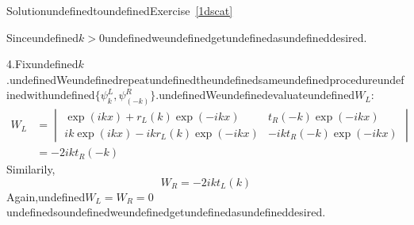 \begin{mystsolution}{SolutionundefinedtoundefinedExercise~\ref{1dscat}}
\begin{enumerate}
Sinceundefined$k>0$undefinedweundefinedgetundefinedasundefineddesired.
\end{enumerate}

4.Fixundefined$k$.undefinedWeundefinedrepeatundefinedtheundefinedsameundefinedprocedureundefinedwithundefined$\{\psi_k^L,\psi_{( -k)}^R\}$.undefinedWeundefinedevaluateundefined$W_L$:
\begin{equation}
\begin{aligned}
W_L &= \begin{vmatrix}
\exp(ikx)+r_L(k)\exp(-ikx) & t_R(-k)\exp(-ikx) \\
ik\exp(ikx)-ikr_L(k)\exp(-ikx) & -ikt_R(-k)\exp(-ikx)
\end{vmatrix} \\
&= -2ikt_R(-k)
\end{aligned}
\end{equation}
Similarily,
\begin{equation}
W_R = -2ikt_L(k)
\end{equation}
Again,undefined$W_L=W_R=0$undefinedsoundefinedweundefinedgetundefinedasundefineddesired.

\end{mystsolution}